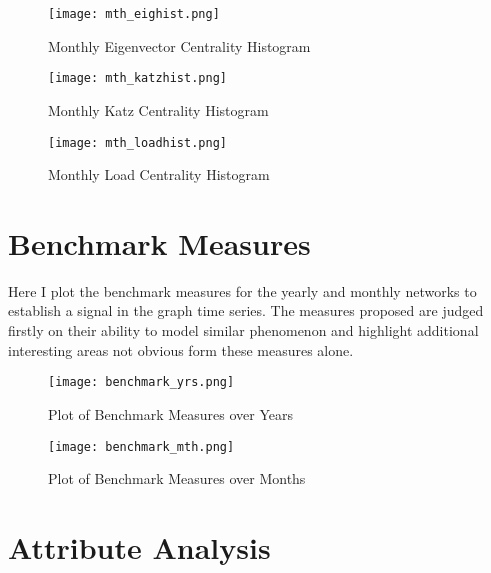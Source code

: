 \begin{figure}[H]
    \centering
    \texttt{[image: mth\_eighist.png]}
    \caption{Monthly Eigenvector Centrality Histogram}
    \label{fig:Monthly Eigenvector Centrality Histogram}
\end{figure}

\begin{figure}[H]
    \centering
    \texttt{[image: mth\_katzhist.png]}
    \caption{Monthly Katz Centrality Histogram}
    \label{fig:Monthly Katz Centrality Histogram}
\end{figure}

\begin{figure}[H]
    \centering
    \texttt{[image: mth\_loadhist.png]}
    \caption{Monthly Load Centrality Histogram}
    \label{fig:Monthly Load Centrality Histogram}
\end{figure}

\section{Benchmark Measures}\label{bmark}

Here I plot the benchmark measures for the yearly and monthly networks to establish a signal in the graph time series. The measures proposed are judged firstly on their ability to model similar phenomenon and highlight additional interesting areas not obvious form these measures alone. \\

\begin{figure}[!htp]
    \centering
    \texttt{[image: benchmark\_yrs.png]}
    \caption{Plot of Benchmark Measures over Years}
    \label{fig:bmark yrs}
\end{figure}

\begin{figure}[!htp]
    \centering
    \texttt{[image: benchmark\_mth.png]}
    \caption{Plot of Benchmark Measures over Months}
    \label{fig:bmark mth}
\end{figure}

\clearpage{}
\section{Attribute Analysis}\label{attanal}

